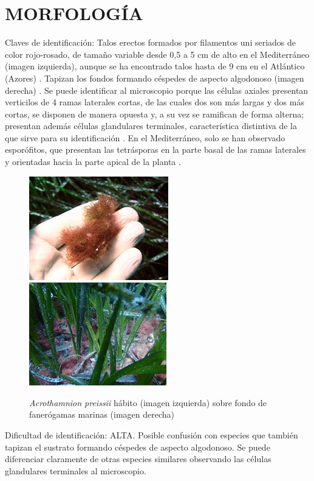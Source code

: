 \documentclass{article}
\begin{document}
\section*{MORFOLOGÍA} 
{\color{olive}Claves de identificación}: Talos erectos formados por filamentos uni seriados de color rojo-rosado, de tamaño variable desde 0,5 a 5 cm de alto en el Mediterráneo (imagen izquierda), aunque se ha encontrado talos hasta de 9 cm en el Atlántico (Azores) \cite{acro2,acro5}. Tapizan los fondos formando céspedes de aspecto algodonoso (imagen derecha) \cite{acro2,acro3}. Se puede identificar al microscopio porque las células axiales presentan verticilos de 4 ramas laterales cortas, de las cuales dos son más largas y dos más cortas, se disponen de manera opuesta y, a su vez se ramifican de forma alterna; presentan además células glandulares terminales, característica distintiva de la que sirve para su identificación \cite{acro2,acro5}. En el Mediterráneo, solo se han observado esporófitos, que presentan las tetrásporas en la parte basal de las ramas laterales y orientadas hacia la parte apical de la planta \cite{acro5,acro6}.
\newline
\begin{figure}[h]
\includegraphics{./images/acro.png}
\includegraphics{./images/acro2.png}
\caption{\textit{Acrothamnion preissii} hábito (imagen izquierda) sobre fondo de fanerógamas marinas (imagen derecha)}
\end{figure}

{\color{olive}Dificultad de identificación}: ALTA. Posible confusión con especies que también tapizan el sustrato formando céspedes de aspecto algodonoso. Se puede diferenciar claramente de otras especies similares observando las células glandulares terminales al microscopio.
\end{document}
